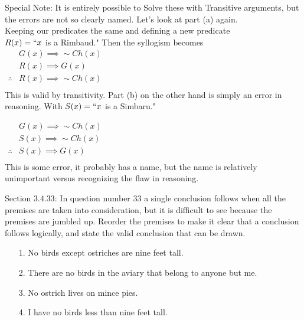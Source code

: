 \documentclass[10 pt]{amsart}
\theoremstyle{definition}
\theoremstyle{remark}
\numberwithin{equation}{subsection}
\begin{document}
Special Note:  It is entirely possible to Solve these with Transitive arguments, but the errors are not so clearly named.  Let's look at part (a) again.\\
Keeping our predicates the same and defining a new predicate\\
$R(x) = `` x$ is a Rimbaud."  Then the syllogism becomes\\

$\begin{array}{rl}
& G(x) \implies \sim Ch(x)\\
& R(x) \implies G (x)\\
\therefore & R(x) \implies \sim Ch(x)\\
\end{array}$\\

This is valid by transitivity.  Part (b) on the other hand is simply an error in reasoning.  With $S(x) = ``x$ is a Simbaru."

$\begin{array}{rl}
& G(x) \implies \sim Ch(x)\\
& S(x) \implies \sim Ch(x)\\
\therefore & S(x) \implies G(x)\\
\end{array}$\\

This is some error, it probably has a name, but the name is relatively unimportant versus recognizing the flaw in reasoning.

\newpage


Section 3.4.33: In question number 33 a single conclusion follows when all the premises are taken into consideration, but it is difficult to see because the premises are jumbled up.  Reorder the premises to make it clear that a conclusion follows logically, and state the valid conclusion that can be drawn.\\

\begin{enumerate}
\item[1.] No birds except ostriches are nine feet tall.\\
\item[2.] There are no birds in the aviary that belong to anyone but me.\\
\item[3.] No ostrich lives on mince pies.\\
\item[4.] I have no birds less than nine feet tall.\\
\end{enumerate}
\end{document}
